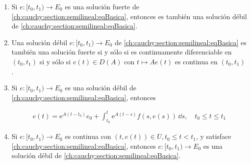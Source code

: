 \begin{Teorema}
    \label{ch:cauchy:section:semilineal:th:solDebilYFuerteRels}

    \begin{enumerate}
        \item Si $e : [t_0, t_1) \rightarrow E_0$ es una solución fuerte de \eqref{ch:cauchy:section:semilineal:eqBasica}, entonces es también una solución débil de \eqref{ch:cauchy:section:semilineal:eqBasica}.

        \item Una solución débil $e : [t_0, t_1) \rightarrow E_0$ de \eqref{ch:cauchy:section:semilineal:eqBasica} es también una solución fuerte si y sólo si es continuamente diferenciable en $(t_0, t_1)$ si y sólo si $e(t) \in D(A)$ con $t \mapsto Ae(t)$ es continua en $(t_0, t_1)$.

        \item Si $e : [t_0, t_1) \rightarrow E_0$ es una solución débil de \eqref{ch:cauchy:section:semilineal:eqBasica}, entonces

        \begin{align}
            \label{ch:cauchy:section:semilineal:th:solDebilYFuerteRels:2}
            e(t) = \mathrm{e}^{A(t-t_0)}e_0 + \int_{t_0}^{t}\mathrm{e}^{A(t-s)}f(s, e(s)) \, \dd s, \quad t_0 \leq t \leq t_1
        \end{align}

        \item Si $e : [t_0, t_1) \rightarrow E_0$ es continua con $(t,e(t)) \in U, t_0 \leq t < t_1$, y satisface \eqref{ch:cauchy:section:semilineal:eqBasica}, entonces $e : [t_0, t_1) \rightarrow E_0$ es una solución débil de \eqref{ch:cauchy:section:semilineal:eqBasica}.
    \end{enumerate}
\end{Teorema}

